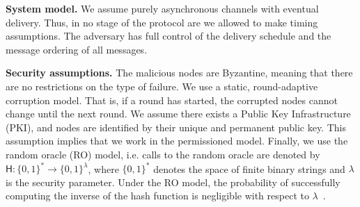 \textbf{System model.\quad}
We assume purely asynchronous channels with eventual delivery.
Thus, in no stage of the protocol are we allowed to make timing assumptions.
The adversary has full control of the delivery schedule and the message ordering of all messages.

\textbf{Security assumptions.\quad}
The malicious nodes are Byzantine,
meaning that there are no restrictions on the type of failure.
We use a static, round-adaptive corruption model.
That is, if a round has started, the corrupted nodes cannot change until the next round.
We assume there exists a Public Key Infrastructure (PKI), and nodes are identified by their unique and permanent public key.
This assumption implies that we work in the permissioned model.
Finally, we use the random oracle (RO) model, i.e. calls to the random oracle are denoted by $\textsf{H}: \{0, 1\}^* \rightarrow \{0, 1\}^\lambda$,
where $\{0, 1\}^*$ denotes the space of finite binary strings and $\lambda$ is the security parameter.
Under the RO model, the probability of successfully computing the inverse of the hash function is negligible with respect to $\lambda$~\cite{bellare1993random}.

